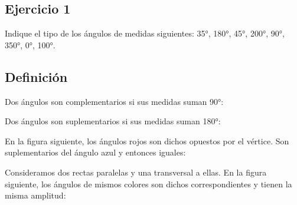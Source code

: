 \subsection{Ejercicio 1}

Indique el tipo de los ángulos de medidas siguientes:
35°, 180°, 45°, 200°, 90°, 350°, 0°, 100°.

\subsection{Definición}

Dos ángulos son complementarios si sus medidas suman 90°:

\begin{center}

\end{center}

Dos ángulos son suplementarios si sus medidas suman 180°:

\begin{center}
\end{center}

En la figura siguiente, los ángulos rojos son dichos opuestos por el vértice.
Son suplementarios del ángulo azul y entonces iguales:

\begin{center}

\end{center}


Consideramos dos rectas paralelas y una transversal a ellas. En la figura
siguiente, los ángulos de mismos colores son dichos correspondientes y tienen
la misma amplitud:

